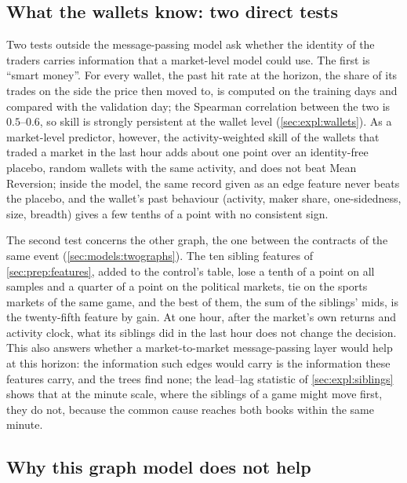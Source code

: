 \subsection{What the wallets know: two direct tests}
\label{sec:graph:smartmoney}

Two tests outside the message-passing model ask whether the identity of the traders carries
information that a market-level model could use.  The first is ``smart money''.  For every
wallet, the past hit rate at the horizon, the share of its trades on the side the price then
moved to, is computed on the training days and compared with the validation day; the
Spearman correlation between the two is $0.5$--$0.6$, so skill is strongly persistent at the
wallet level (\cref{sec:expl:wallets}).  As a market-level predictor, however, the
activity-weighted skill of the wallets that traded a market in the last hour adds about one
point over an identity-free placebo, random wallets with the same activity, and does not
beat Mean Reversion; inside the model, the same record given as an edge feature never beats
the placebo, and the wallet's past behaviour (activity, maker share, one-sidedness, size,
breadth) gives a few tenths of a point with no consistent sign.

The second test concerns the other graph, the one between the contracts of the same event
(\cref{sec:models:twographs}).
\label{sec:graph:siblings}
The ten sibling features of \cref{sec:prep:features}, added to the control's table, lose a
tenth of a point on all samples and a quarter of a point on the political markets, tie on
the sports markets of the same game, and the best of them, the sum of the siblings' mids, is
the twenty-fifth feature by gain.  At one hour, after the market's own returns and activity
clock, what its siblings did in the last hour does not change the decision.  This also
answers whether a market-to-market message-passing layer would help at this horizon: the
information such edges would carry is the information these features carry, and the trees
find none; the lead--lag statistic of \cref{sec:expl:siblings} shows that at the minute
scale, where the siblings of a game might move first, they do not, because the common cause
reaches both books within the same minute.

\subsection{Why this graph model does not help}
\label{sec:graph:why}

